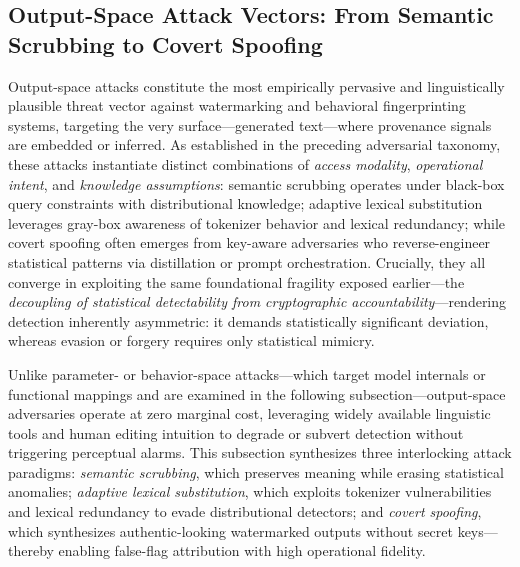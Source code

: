 \documentclass[11pt,a4paper]{article}
\begin{document}
\subsection{Output-Space Attack Vectors: From Semantic Scrubbing to Covert Spoofing}


Output-space attacks constitute the most empirically pervasive and linguistically plausible threat vector against watermarking and behavioral fingerprinting systems, targeting the very surface---generated text---where provenance signals are embedded or inferred. As established in the preceding adversarial taxonomy, these attacks instantiate distinct combinations of \emph{access modality}, \emph{operational intent}, and \emph{knowledge assumptions}: semantic scrubbing operates under black-box query constraints with distributional knowledge; adaptive lexical substitution leverages gray-box awareness of tokenizer behavior and lexical redundancy; while covert spoofing often emerges from key-aware adversaries who reverse-engineer statistical patterns via distillation or prompt orchestration. Crucially, they all converge in exploiting the same foundational fragility exposed earlier---the \emph{decoupling of statistical detectability from cryptographic accountability}---rendering detection inherently asymmetric: it demands statistically significant deviation, whereas evasion or forgery requires only statistical mimicry.

Unlike parameter- or behavior-space attacks---which target model internals or functional mappings and are examined in the following subsection---output-space adversaries operate at zero marginal cost, leveraging widely available linguistic tools and human editing intuition to degrade or subvert detection without triggering perceptual alarms. This subsection synthesizes three interlocking attack paradigms: \emph{semantic scrubbing}, which preserves meaning while erasing statistical anomalies; \emph{adaptive lexical substitution}, which exploits tokenizer vulnerabilities and lexical redundancy to evade distributional detectors; and \emph{covert spoofing}, which synthesizes authentic-looking watermarked outputs without secret keys---thereby enabling false-flag attribution with high operational fidelity.
\end{document}
